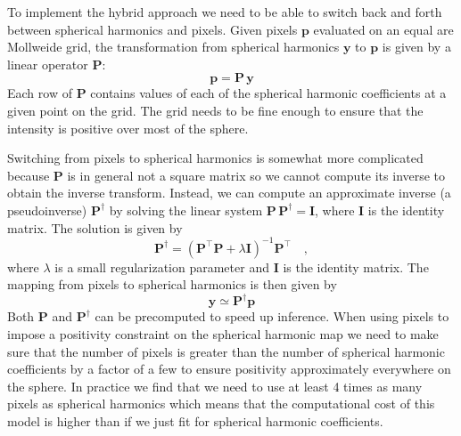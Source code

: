 \documentclass[linenumbers,modern]{aastex62}
\begin{document}
To implement the hybrid approach we need to be able to switch back and forth between spherical harmonics and pixels.
Given pixels $\mathbf{p}$ evaluated on an equal are Mollweide grid, the transformation from spherical harmonics $\mathbf{y}$ to $\mathbf{p}$ is given by a linear operator $\mathbf{P}$:
\begin{equation}
    \mathbf{p}=\mathbf{P}\,\mathbf{y}
    \label{eq:ylms_to_pixels}
\end{equation}
Each row of $\mathbf{P}$ contains values of each of the spherical harmonic coefficients at a given point on the grid. 
The grid needs to be fine enough to ensure that the intensity is positive over most of the sphere.

Switching from pixels to spherical harmonics is somewhat more complicated because $\mathbf{P}$ is in general not a square matrix so we cannot compute its inverse to obtain the inverse transform.
Instead, we can compute an approximate inverse (a pseudoinverse) $\mathbf{P}^\dagger$ by solving the linear system $\mathbf{P}\,\mathbf{P}^\dagger=\mathbf{I}$, where $\mathbf{I}$ is the identity matrix. 
The solution is given by
\begin{equation}
\mathbf{P}^\dagger=\left(\mathbf{P}^{\top} \mathbf{P}+\lambda \mathbf{I}\right)^{-1} \mathbf{P}^{\top}
    \quad,
\end{equation}
where $\lambda$ is a small regularization parameter and $\mathbf{I}$ is the identity matrix.
The mapping from pixels to spherical harmonics is then given by
\begin{equation}
    \mathbf{y}\simeq\mathbf{P}^\dagger\mathbf{p}
    \label{eq:pixels_to_ylms}
\end{equation}
Both $\mathbf{P}$ and $\mathbf{P}^\dagger$ can be precomputed to speed up inference.
When using pixels to impose a positivity constraint on the spherical harmonic map we need to make sure that the number of pixels is greater than the number of spherical harmonic coefficients by a factor of a few to ensure positivity approximately everywhere on the sphere.
In practice we find that we need to use at least 4 times as many pixels as spherical harmonics which means that the computational cost of this model is higher than if we just fit for spherical harmonic coefficients. 
\end{document}
